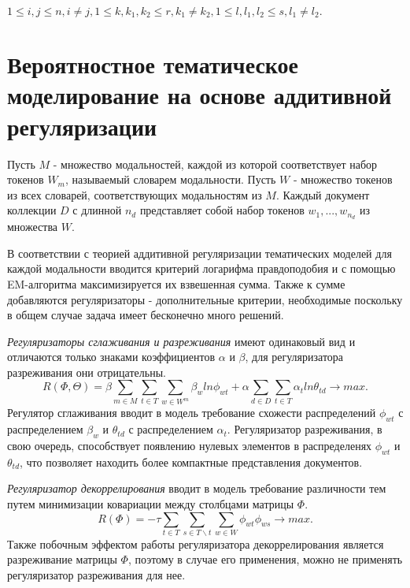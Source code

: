 \documentclass[12pt,twoside]{article}
\begin{document}
$1 \leq i,j \leq n, i \neq j, 1 \leq k, k_{1}, k_{2} \leq r, k_{1} \neq k_{2}, 1 \leq l, l_{1},l_{2} \leq s, l_{1} \neq l_{2}.$


\section{Вероятностное тематическое моделирование на основе аддитивной регуляризации}

Пусть $M$ - множество модальностей, каждой из которой соответствует набор токенов $W_{m}$, называемый словарем модальности. Пусть $W$ - множество токенов из всех словарей, соответствующих модальностям из $M$. Каждый документ коллекции $D$ с длинной ${n_{d}}$  представляет собой набор токенов $w_{1},...,w_{n_{d}}$ из множества $W$.

В соответствии с теорией аддитивной регуляризации тематических моделей для каждой модальности вводится критерий логарифма правдоподобия и с помощью EM-алгоритма максимизируется их взвешенная сумма. Также к сумме добавляются регуляризаторы - дополнительные критерии, необходимые поскольку в общем случае задача имеет бесконечно много решений.

\emph{Регуляризаторы сглаживания и разреживания} имеют одинаковый вид и отличаются только знаками коэффициентов $\alpha$ и $\beta$, для регуляризатора разреживания они отрицательны.
\begin{equation}
R(\Phi,\Theta)=\beta \sum_{m \in M}\sum_{t \in T}\sum_{w \in W^m} \beta_{w} ln \phi_{wt} + \alpha \sum_{d \in D}\sum_{t \in T}\alpha_{t} ln\theta_{td}\to max.
\end{equation} 
Регулятор сглаживания вводит в модель требование схожести распределений $\phi_{wt}$ с распределением $\beta_{w}$ и $\theta_{td}$ с распределением $\alpha_{t}$. Регуляризатор разреживания, в свою очередь, способствует появлению нулевых элементов в распределенях $\phi_{wt}$ и $\theta_{td}$, что позволяет находить более компактные представления документов.

\emph{Регуляризатор декоррелирования} вводит в модель требование различности тем путем минимизации ковариации между столбцами матрицы $\Phi$.
\begin{equation}
R(\Phi)=-\tau \sum_{t \in T}\sum_{s \in T\backslash t}\sum_{w \in W} \phi_{wt}\phi_{ws} \to max.
\end{equation} 
Также побочным эффектом работы регуляризатора декоррелирования является разреживание матрицы $\Phi$, поэтому в случае его применения, можно не применять регуляризатор разреживания для нее.
\end{document}
